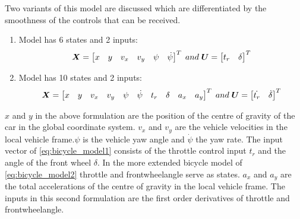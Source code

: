 Two variants of this model are discussed which are differentiated by the smoothness of the controls that can be received. 
\begin{enumerate}
	\item	Model has 6 states and 2 inputs: 
	\begin{equation}\label{eq:bicycle_model1}
	\centering
	\bm{X} = 
	\begin{bmatrix}
	x & y & v_x & v_y & \psi & \dot{\psi}
	\end{bmatrix}^{T}
	\; and \; \bm{U} = 
	\begin{bmatrix}
	t_r & \delta
	\end{bmatrix}^{T}
	\end{equation}
	
	\item Model has 10 states and 2 inputs:
	\begin{equation}\label{eq:bicycle_model2}
	\centering
	\bm{X} = 
	\begin{bmatrix}
	x & y & v_x & v_y & \psi & \dot{\psi} & t_r & \delta & a_x & a_y
	\end{bmatrix}^{T}
	\; and \; \bm{U} = 
	\begin{bmatrix}
	\dot{t_r} & \dot{\delta}
	\end{bmatrix}^{T}
	\end{equation}
\end{enumerate}


$x$ and $y$ in the above formulation are the position of the centre of gravity of the car in the global coordinate system. $v_x$ and $v_y$ are the vehicle velocities in the local vehicle frame.$\psi$ is the vehicle yaw angle and $\dot{\psi}$ the yaw rate.  The input vector of \ref{eq:bicycle_model1} consists of the throttle control input $t_r$ and the angle of the front wheel $\delta$. In the more extended bicycle model of \ref{eq:bicycle_model2} throttle and frontwheelangle serve as states. $a_x$ and $a_y$ are the total accelerations of the centre of gravity in the local vehicle frame. The inputs in this second formulation are the first order derivatives of throttle and frontwheelangle.\\

